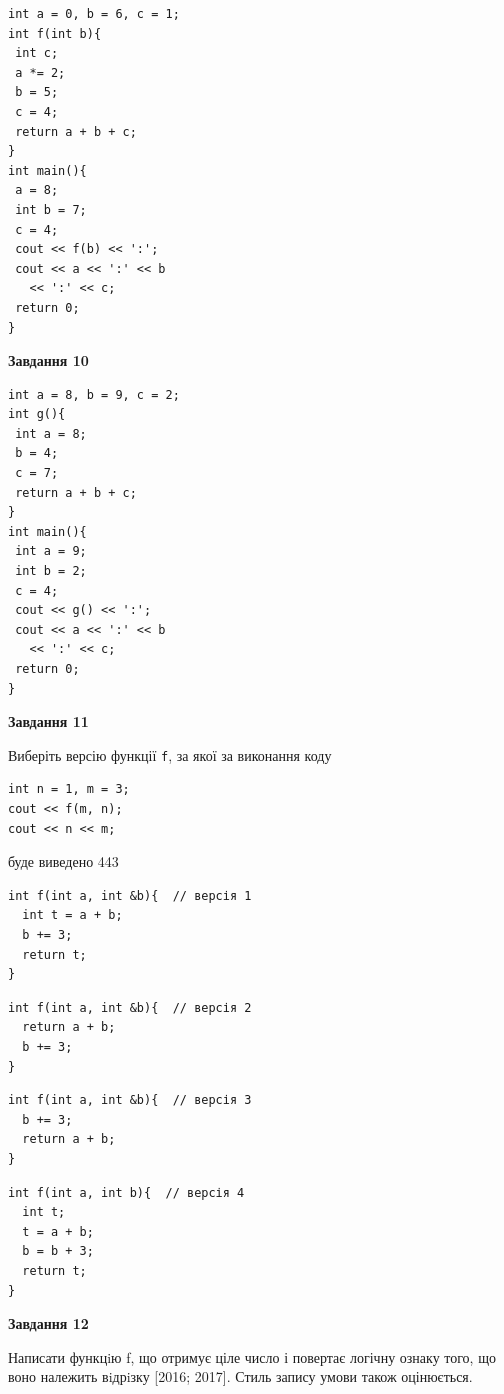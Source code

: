 \documentclass[12pt, ukrainian]{article}
\def\code#1{\Verb!#1!}
\begin{document}
{\begin {large}
\begin{minipage}[t]{7.0cm}
\begin{verbatim}
int a = 0, b = 6, c = 1;
int f(int b){
 int c;
 a *= 2;
 b = 5;
 c = 4;
 return a + b + c;
}
int main(){
 a = 8;
 int b = 7;
 c = 4;
 cout << f(b) << ':';
 cout << a << ':' << b 
   << ':' << c;
 return 0;
}
\end{verbatim}



\begin{center}
\textbf{Завдання 10}
\end{center}
\vspace{-8mm}

\begin{verbatim}
int a = 8, b = 9, c = 2;
int g(){
 int a = 8;
 b = 4;
 c = 7;
 return a + b + c;
}
int main(){
 int a = 9;
 int b = 2;
 c = 4;
 cout << g() << ':';
 cout << a << ':' << b 
   << ':' << c;
 return 0;
}
\end{verbatim}

\end{minipage}
\vline \hspace{1mm}
\begin{minipage}[t]{11.0cm}

\begin{center}
\textbf{Завдання 11}
\end{center}
Виберіть версію функції \code{f}, за якої за виконання коду
\begin{verbatim}
int n = 1, m = 3;
cout << f(m, n);
cout << n << m;
\end{verbatim}

буде виведено 443

\begin{verbatim}
int f(int a, int &b){  // версія 1
  int t = a + b;
  b += 3;
  return t;
}
\end{verbatim}

\vspace{-8mm}\begin{verbatim}
int f(int a, int &b){  // версія 2
  return a + b;
  b += 3;
}
\end{verbatim}

\vspace{-8mm}\begin{verbatim}
int f(int a, int &b){  // версія 3
  b += 3;
  return a + b;
}
\end{verbatim}

\vspace{-8mm}\begin{verbatim}
int f(int a, int b){  // версія 4
  int t;
  t = a + b;
  b = b + 3;
  return t;
}
\end{verbatim}



\begin{center}
\textbf{Завдання 12}
\end{center}

Написати функцiю f, що отримує ціле число і повертає логічну ознаку того, що воно належить вiдрiзку [2016; 2017]. Стиль запису умови також оцінюється.\par

\end{minipage}

\end {large}}
\end{document}
